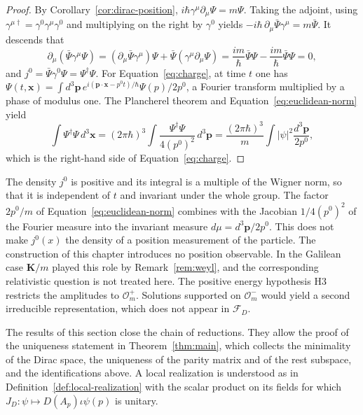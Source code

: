\begin{proof}
	By Corollary~\ref{cor:dirac-position}, $i\hbar\gamma^\mu\partial_\mu\Psi=m\Psi$. Taking the adjoint, using $\gamma^{\mu\dagger}=\gamma^0\gamma^\mu\gamma^0$ and multiplying on the right by $\gamma^0$ yields $-i\hbar\,\partial_\mu\bar{\Psi}\gamma^\mu=m\bar{\Psi}$. It descends that
	\begin{equation*}
		\partial_\mu(\bar{\Psi}\gamma^\mu\Psi)=(\partial_\mu\bar{\Psi}\gamma^\mu)\Psi+\bar{\Psi}(\gamma^\mu\partial_\mu\Psi)=\frac{im}{\hbar}\bar{\Psi}\Psi-\frac{im}{\hbar}\bar{\Psi}\Psi=0,
	\end{equation*}
	and $j^0=\bar{\Psi}\gamma^0\Psi=\Psi^\dagger\Psi$. For Equation~\eqref{eq:charge}, at time $t$ one has $\Psi(t,\mathbf{x})=\int d^3\mathbf{p}\,e^{i(\mathbf{p}\cdot\mathbf{x}-p^0t)/\hbar}\Psi(p)/2p^0$, a Fourier transform multiplied by a phase of modulus one. The Plancherel theorem \cite[TODO-location]{TODO-RS03} and Equation~\eqref{eq:euclidean-norm} yield
	\begin{equation*}
		\int\Psi^\dagger\Psi\,d^3\mathbf{x}=(2\pi\hbar)^3\int\frac{\Psi^\dagger\Psi}{4(p^0)^2}\,d^3\mathbf{p}=\frac{(2\pi\hbar)^3}{m}\int|\psi|^2\frac{d^3\mathbf{p}}{2p^0},
	\end{equation*}
	which is the right-hand side of Equation~\eqref{eq:charge}.
\end{proof}

\begin{remark}\label{rem:probability-limits}
	The density $j^0$ is positive and its integral is a multiple of the Wigner norm, so that it is independent of $t$ and invariant under the whole group. The factor $2p^0/m$ of Equation~\eqref{eq:euclidean-norm} combines with the Jacobian $1/4(p^0)^2$ of the Fourier measure into the invariant measure $d\mu=d^3\mathbf{p}/2p^0$. This does not make $j^0(x)$ the density of a position measurement of the particle. The construction of this chapter introduces no position observable. In the Galilean case $\mathbf{K}/m$ played this role by Remark~\ref{rem:weyl}, and the corresponding relativistic question is not treated here. The positive energy hypothesis H3 restricts the amplitudes to $\mathcal{O}_m^+$. Solutions supported on $\mathcal{O}_m^-$ would yield a second irreducible representation, which does not appear in $\mathcal{F}_D$.
\end{remark}

The results of this section close the chain of reductions. They allow the proof of the uniqueness statement in Theorem~\ref{thm:main}, which collects the minimality of the Dirac space, the uniqueness of the parity matrix and of the rest subspace, and the identifications above. A local realization is understood as in Definition~\ref{def:local-realization} with the scalar product on its fields for which $J_D:\psi\mapsto D(A_p)\iota\psi(p)$ is unitary.

